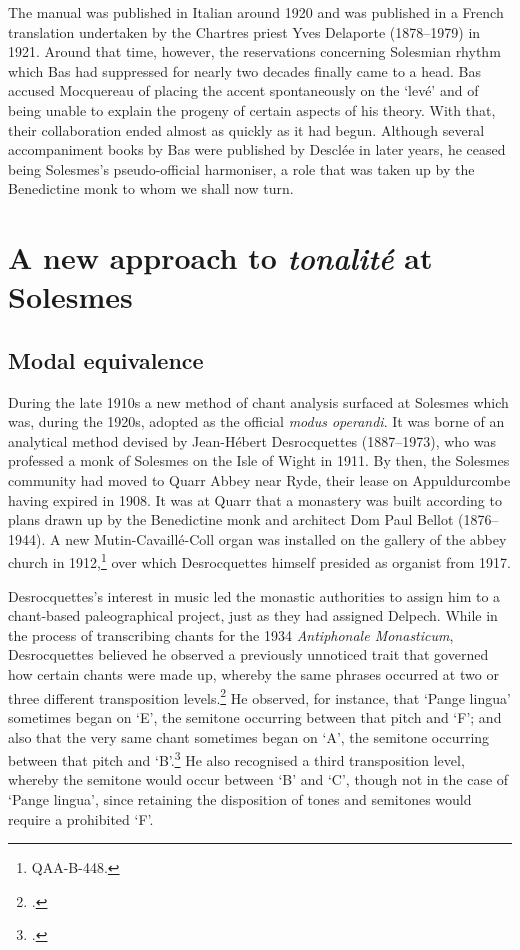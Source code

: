 The manual was published in Italian around 1920 and was published in a French translation undertaken by the Chartres priest Yves Delaporte (1878--1979) in 1921.
Around that time, however, the reservations concerning Solesmian rhythm which Bas had suppressed for nearly two decades finally came to a head.
Bas accused Mocquereau of placing the accent spontaneously on the `levé' and of being unable to explain the progeny of certain aspects of his theory.
With that, their collaboration ended almost as quickly as it had begun.
Although several accompaniment books by Bas were published by Desclée in later years, he ceased being Solesmes's pseudo-official harmoniser, a role that was taken up by the Benedictine monk to whom we shall now turn.


\section{A new approach to \emph{tonalité} at Solesmes}
\label{hl:three_groups}%
\subsection{Modal equivalence}
\label{ln:quarr_foundation}\label{cc:dd_equiv}%
During the late 1910s a new method of chant analysis surfaced at Solesmes which was, during the 1920s, adopted as the official \emph{modus operandi}.
It was borne of an analytical method devised by Jean-Hébert Desrocquettes (1887--1973), who was professed a monk of Solesmes on the Isle of Wight in 1911.
By then, the Solesmes community had moved to Quarr Abbey near Ryde, their lease on Appuldurcombe having expired in 1908.
It was at Quarr that a monastery was built according to plans drawn up by the Benedictine monk and architect Dom Paul Bellot (1876--1944).
A new Mutin-Cavaillé-Coll organ was installed on the gallery of the abbey church in 1912,\footnote{\qaa{} QAA-B-448.} over which Desrocquettes himself presided as organist from 1917.

Desrocquettes's interest in music led the monastic authorities to assign him to a chant-based paleographical project, just as they had assigned Delpech.
While in the process of transcribing chants for the 1934 \emph{Antiphonale Monasticum}, Desrocquettes believed he observed a previously unnoticed trait that governed how certain chants were made up, whereby the same phrases occurred at two or three different transposition levels.\footcite[108--109]{ClaireModalityWesternChant2008}
He observed, for instance, that `Pange lingua' sometimes began on `E', the semitone occurring between that pitch and `F'; and also that the very same chant sometimes began on `A', the semitone occurring between that pitch and `B'\kern 1pt\flat{}.\footcite[29]{DesrocquettesListeprincipalesequivalences1925}
He also recognised a third transposition level, whereby the semitone would occur between `B' and `C', though not in the case of `Pange lingua', since retaining the disposition of tones and semitones would require a prohibited `F'\kern 1pt\sharp{}.

